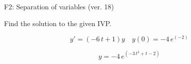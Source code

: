 \begin{exercise}
  \begin{exerciseTitle}F2: Separation of variables (ver. 18)\end{exerciseTitle}
  \begin{exerciseStatement}
    
Find the solution to the given IVP.

    
\[y'=( -6 \, t + 1 )y\hspace{1em} y(0)= -4 \, e^{\left(-2\right)}\]

  \end{exerciseStatement}
  \begin{exerciseAnswer}
    
\[y= -4 \, e^{\left(-3 \, t^{2} + t - 2\right)}\]

  \end{exerciseAnswer}
\end{exercise}
